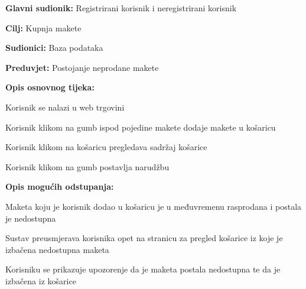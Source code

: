 					\noindent {}
					\begin{packed_item}
						
						\item \textbf{Glavni sudionik: }Registrirani korisnik i neregistrirani korisnik
						\item  \textbf{Cilj:} Kupnja makete
						\item  \textbf{Sudionici:} Baza podataka
						\item  \textbf{Preduvjet:} Postojanje neprodane makete
						\item  \textbf{Opis osnovnog tijeka:}
						
						\item[] \begin{packed_enum}
							
							\item Korisnik se nalazi u web trgovini
							\item Korisnik klikom na gumb ispod pojedine makete dodaje makete u košaricu
							\item Korisnik klikom na košaricu pregledava sadržaj košarice
							\item Korisnik klikom na gumb postavlja narudžbu
						\end{packed_enum}
					
						\item  \textbf{Opis mogućih odstupanja:}
						
						\item[] \begin{packed_item}
							
							\item[4.a] Maketa koju je korisnik dodao u košaricu je u međuvremenu rasprodana i postala je nedostupna
							\item[] \begin{packed_enum}
								
								\item Sustav preusmjerava korisnika opet na stranicu za pregled košarice iz koje je izbačena nedostupna maketa
								\item Korisniku se prikazuje upozorenje da je maketa postala nedostupna te da je izbačena iz košarice
								
							\end{packed_enum}
							
						\end{packed_item}
						
					\end{packed_item}
				
